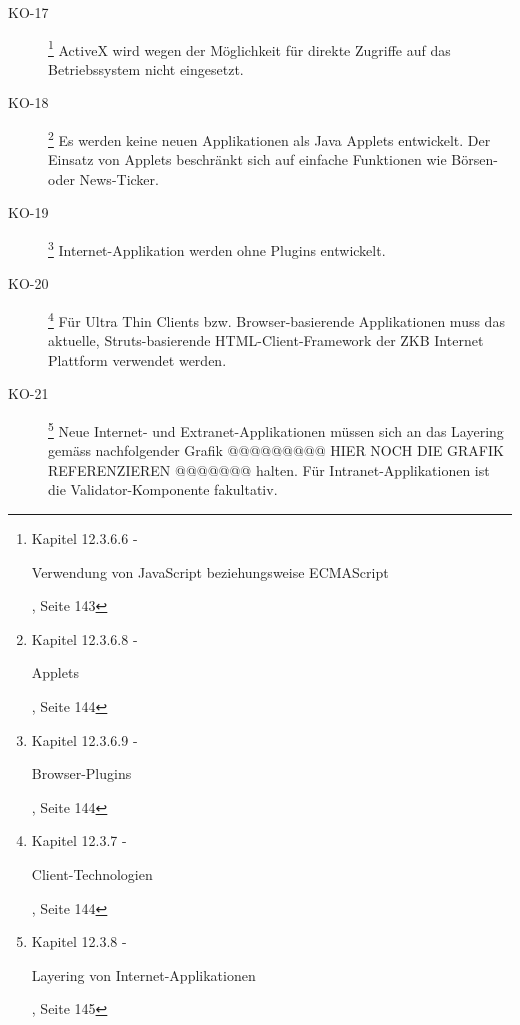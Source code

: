 \begin{description}
    \item[KO-17\label{itm:KO-17}]
    \footnote{\cite{ZkbHandbuchDerItArchitektur} Kapitel 12.3.6.6 -
    \begin{itshape}Verwendung von JavaScript beziehungsweise
    ECMAScript\end{itshape}, Seite 143}
    ActiveX wird wegen der Möglichkeit für direkte Zugriffe auf das
    Betriebssystem nicht eingesetzt.
    
    \item[KO-18\label{itm:KO-18}]
    \footnote{\cite{ZkbHandbuchDerItArchitektur} Kapitel 12.3.6.8 -
    \begin{itshape}Applets\end{itshape}, Seite 144}
    Es werden keine neuen Applikationen als Java Applets entwickelt. Der
    Einsatz von Applets beschränkt sich auf einfache Funktionen wie Börsen-
    oder News-Ticker.
    
    \item[KO-19\label{itm:KO-19}]
    \footnote{\cite{ZkbHandbuchDerItArchitektur} Kapitel 12.3.6.9 -
    \begin{itshape}Browser-Plugins\end{itshape}, Seite 144}
    Internet-Applikation werden ohne Plugins entwickelt.
    
    \item[KO-20\label{itm:KO-20}]
    \footnote{\cite{ZkbHandbuchDerItArchitektur} Kapitel 12.3.7 -
    \begin{itshape}Client-Technologien\end{itshape}, Seite 144}
    Für Ultra Thin Clients bzw. Browser-basierende Applikationen muss das
    aktuelle, Struts-basierende HTML-Client-Framework der ZKB Internet
    Plattform verwendet werden.
    
    \item[KO-21\label{itm:KO-21}]
    \footnote{\cite{ZkbHandbuchDerItArchitektur} Kapitel 12.3.8 -
    \begin{itshape}Layering von Internet-Applikationen\end{itshape}, Seite 145}
    Neue Internet- und Extranet-Applikationen müssen sich an das Layering
    gemäss nachfolgender Grafik @@@@@@@@@ HIER NOCH DIE GRAFIK REFERENZIEREN
    @@@@@@@ halten. Für Intranet-Applikationen ist die Validator-Komponente
    fakultativ.
    

\end{description}
